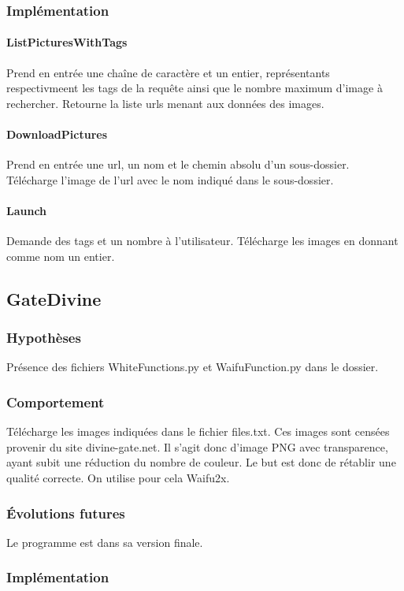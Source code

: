 \documentclass[a4paper,12pt]{article}
\begin{document}
\subsubsection{Implémentation}
\paragraph{ListPicturesWithTags}
Prend en entrée une chaîne de caractère et un entier, représentants respectivmeent les tags de la requête ainsi que le nombre maximum d'image à rechercher. Retourne la liste urls menant aux données des images.
\paragraph{DownloadPictures}
Prend en entrée une url, un nom et le chemin absolu d'un sous-dossier. Télécharge l'image de l'url avec le nom indiqué dans le sous-dossier.
\paragraph{Launch}
Demande des tags et un nombre à l'utilisateur. Télécharge les images en donnant comme nom un entier.

\subsection{GateDivine}
\subsubsection{Hypothèses}
Présence des fichiers WhiteFunctions.py et WaifuFunction.py dans le dossier.
\subsubsection{Comportement}
Télécharge les images indiquées dans le fichier files.txt. Ces images sont censées provenir du site divine-gate.net. Il s'agit donc d'image PNG avec transparence, ayant subit une réduction du nombre de couleur. Le but est donc de rétablir une qualité correcte. On utilise pour cela Waifu2x.
\subsubsection{Évolutions futures}
Le programme est dans sa version finale.
\subsubsection{Implémentation}
\end{document}
